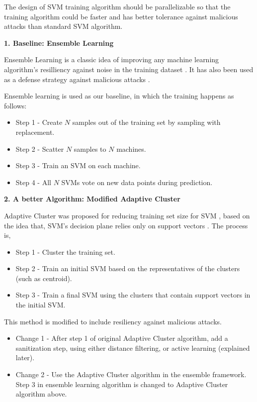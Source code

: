 \documentclass[10pt,conference,compsocconf,letterpaper]{IEEEtran}
\begin{document}
The design of SVM training algorithm should be parallelizable so that the training algorithm could be faster and has better tolerance against malicious attacks than standard SVM algorithm.

\textbf{1. Baseline: Ensemble Learning}

Ensemble Learning is a classic idea of improving any machine learning algorithm's resilliency against noise in the training dataset \cite{leo96, dong05}. It has also been used as a defense strategy against malicious attacks \cite{marco08, gabriela08}. 

Ensemble learning is used as our baseline, in which the training happens as follows:

\begin{itemize}
\item Step 1 - Create $N$ samples out of the training set by sampling with replacement.
\item Step 2 - Scatter $N$ samples to $N$ machines.
\item Step 3 - Train an SVM on each machine.
\item Step 4 - All $N$ SVMs vote on new data points during prediction.
\end{itemize}

\textbf{2. A better Algorithm: Modified Adaptive Cluster}

Adaptive Cluster was proposed for reducing training set size for SVM \cite{boley04, hwanjo03}, based on the idea that, SVM's decision plane relies only on support vectors \cite{koggalage04}. The process is, 

\begin{itemize}
\item Step 1 - Cluster the training set.
\item Step 2 - Train an initial SVM based on the representatives of the clusters (such as centroid).
\item Step 3 - Train a final SVM using the clusters that contain support vectors in the initial SVM.
\end{itemize}

This method is modified to include resiliency against malicious attacks.

\begin{itemize}
\item Change 1 - After step 1 of original Adaptive Cluster algorithm, add a sanitization step, using either distance filtering, or active learning (explained later).
\item Change 2 - Use the Adaptive Cluster algorithm in the ensemble framework. Step 3 in ensemble learning algorithm is changed to Adaptive Cluster algorithm above.
\end{itemize}
\end{document}
